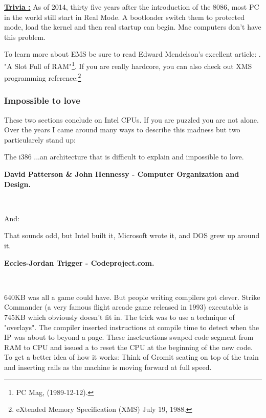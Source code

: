 \documentclass[book.tex]{subfiles}
\begin{document}
\textbf{\underline{Trivia :}}  As of 2014, thirty five years after the introduction of the 8086, most PC in the world still start in Real Mode. A bootloader switch them to protected mode, load the kernel and then real startup can begin. Mac computers don't have this problem.

\bigskip
To learn more about EMS be sure to read Edward Mendelson's excellent article: . "A Slot Full of RAM"\footnote{PC Mag, (1989-12-12).}. If you are really hardcore, you can also check out XMS programming reference:\footnote{eXtended Memory Specification (XMS) July 19, 1988.}\\
\par

\subsubsection{Impossible to love}
These two sections conclude on Intel CPUs. If you are puzzled you are not alone. Over the years I came around many ways to describe this madness but two particularely stand up:\\
\par
 \begin{fancyquotes}
   The i386 \lbrack...\rbrack an architecture that is difficult to explain and impossible to love.\\
   \par
\textbf{David Patterson \& John Hennessy - Computer Organization and Design.}
 \end{fancyquotes}\\
\par
And:
\par
 \begin{fancyquotes}
    That sounds odd, but Intel built it, Microsoft wrote it, and DOS grew up around it.\\
   \par
\textbf{Eccles-Jordan Trigger - Codeproject.com.}
 \end{fancyquotes}\\



\par
{} 640KB was all a game could have. But people writing compilers got clever. Strike Commander (a very famous flight arcade game released in 1993) executable is 745KB which obviously doesn't fit in. The trick was to use a technique of "overlays". The compiler inserted instructions at compile time to detect when the IP was about to beyond a page. These insctructions swaped code segment from RAM to CPU and issued a  to reset the CPU at the beginning of the new code. To get a better idea of how it works: Think of Gromit seating on top of the train and inserting rails as the machine is moving forward at full speed.
\end{document}
